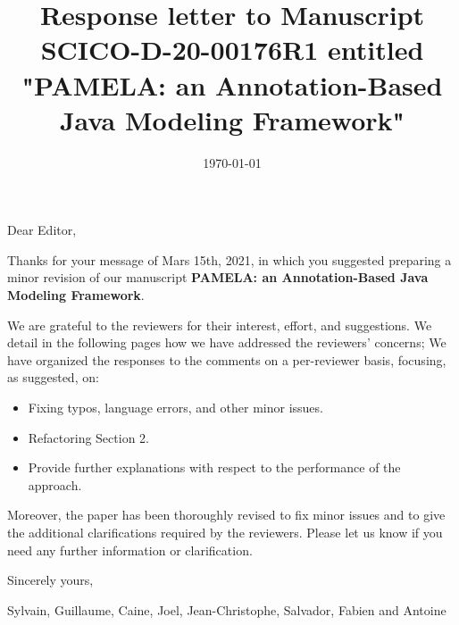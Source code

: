 \documentclass[10pt]{article}
\title{Response letter to Manuscript SCICO-D-20-00176R1 entitled "PAMELA: an Annotation-Based Java Modeling Framework"}
\date{\today}
\begin{document}
Dear Editor,

\bigskip
Thanks for your message of Mars 15th, 2021, in which you suggested preparing a minor revision of our manuscript  \textbf{PAMELA: an Annotation-Based Java Modeling Framework}. 

\bigskip
We are grateful to the reviewers for their interest, effort, and suggestions. We detail in the following pages how we have addressed the reviewers' concerns;  We have organized the responses to the comments on a per-reviewer basis, focusing, as suggested, on: 

\begin{itemize}
\item Fixing typos, language errors, and other minor issues.
\item Refactoring Section 2.
\item Provide further explanations with respect to the performance of the approach.
\end{itemize}

Moreover, the paper has been thoroughly revised to fix minor issues and to give the additional clarifications required by the reviewers. Please let us know if you need any further information or clarification.

\bigskip
Sincerely yours,

\bigskip
Sylvain, Guillaume, Caine, Joel, Jean-Christophe, Salvador, Fabien and Antoine

\pagebreak
\end{document}
